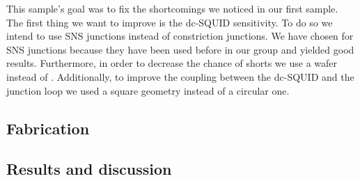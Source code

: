 This sample's goal was to fix the shortcomings we noticed in our first sample. The first thing we want to improve is the dc-SQUID sensitivity. To do so we intend to use SNS junctions instead of constriction junctions. We have chosen for SNS junctions because they have been used before in our group and yielded good results\cite{rogSQUIDontipMagneticMicroscopy2022}. Furthermore, in order to decrease the chance of shorts we use a  wafer instead of . Additionally, to improve the coupling between the dc-SQUID and the junction loop we used a square geometry instead of a circular one. 

\subsection{Fabrication}


\subsection{Results and discussion}
